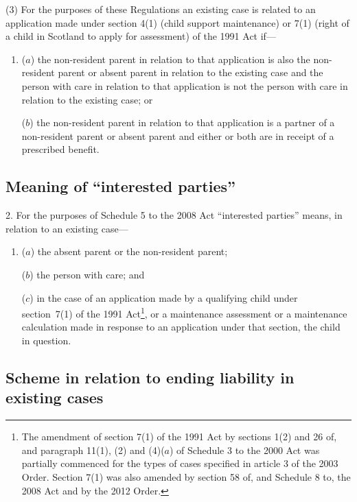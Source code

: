\documentclass[12pt,a4paper]{article}
\begin{document}
(3) For the purposes of these Regulations an existing case is related to an application made under section 4(1) (child support maintenance) or 7(1) (right of a child in Scotland to apply for assessment) of the 1991 Act if—
\begin{enumerate}\item[]
($a$) the non-resident parent in relation to that application is also the non-resident parent or absent parent in relation to the existing case and the person with care in relation to that application is not the person with care in relation to the existing case; or

($b$) the non-resident parent in relation to that application is a partner of a non-resident parent or absent parent and either or both are in receipt of a prescribed benefit.
\end{enumerate}


\subsection[2. Meaning of “interested parties”]{Meaning of “interested parties”}

2.  For the purposes of Schedule 5 to the 2008 Act “interested parties” means, in relation to an existing case—
\begin{enumerate}\item[]
($a$) the absent parent or the non-resident parent;

($b$) the person with care; and

($c$) in the case of an application made by a qualifying child under section~7(1) of the 1991 Act\footnote{The amendment of section 7(1) of the 1991 Act by sections 1(2) and 26 of, and paragraph 11(1), (2) and (4)($a$)  of Schedule 3 to the 2000 Act was partially commenced for the types of cases specified in article 3 of the 2003 Order. Section 7(1) was also amended by section 58 of, and Schedule 8 to, the 2008 Act and by the 2012 Order.}, or a maintenance assessment or a maintenance calculation made in response to an application under that section, the child in question.
\end{enumerate}

\subsection[3. Scheme in relation to ending liability in existing cases]{Scheme in relation to ending liability in existing cases}
\end{document}
